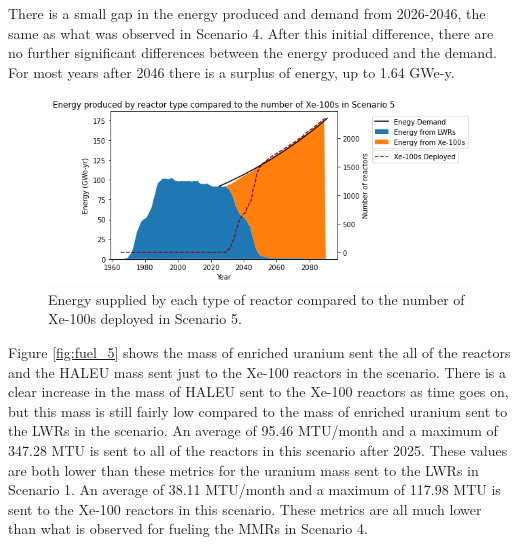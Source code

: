 There is a small gap in the energy produced and demand from 
2026-2046, the same as what was observed in Scenario 4. After this 
initial difference, there are no further significant differences between 
the energy produced and the demand. For most years after 2046 there 
is a surplus of energy, up to 1.64 GWe-y. 

\begin{figure}
    \centering 
    \includegraphics[scale=0.5]{figures/energy_scenario5.png}
    \caption{Energy supplied by each type of reactor compared to the number of 
    Xe-100s deployed in Scenario 5.}
    \label{fig:energy_rx_5}
\end{figure}

Figure \ref{fig:fuel_5} shows the mass of enriched uranium sent the all of 
the reactors and the \gls{HALEU} mass sent just to the Xe-100 reactors in 
the scenario. There is a clear increase in the mass of \gls{HALEU} sent 
to the Xe-100 reactors as time goes on, but this mass is still fairly 
low compared to the mass of enriched uranium sent to the \glspl{LWR} in 
the scenario. An average of 95.46 MTU/month and a maximum of 347.28 MTU 
is sent to all of the reactors in this scenario after 2025. These 
values are both lower than these metrics for the uranium mass sent to the 
\glspl{LWR} in Scenario 1. An average of 
38.11 MTU/month and a maximum of 117.98 MTU is sent to the Xe-100 reactors 
in this scenario. These metrics are all much lower than what is observed 
for fueling the \glspl{MMR} in Scenario 4.


